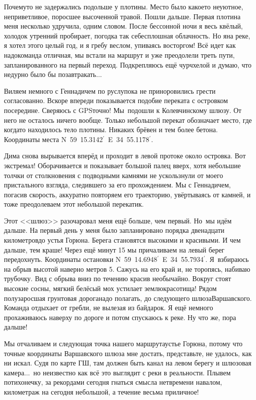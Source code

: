 Почему\sdash то не задержались подольше у плотины. Место было какое\sdash то неуютное, неприветливое, поросшее высоченной травой. Пошли дальше. Первая плотина меня несколько удручила, одним словом. После бессонной ночи я весь квёлый, холодок утренний пробирает, погодка так себе\mdash сплошная облачность. Но я\mdash на реке, я хотел этого целый год, и я гребу веслом, упиваясь восторгом! Всё идет как надо\mdash команда отличная, мы встали на маршрут и уже преодолели треть пути, запланированного на первый переход. Подкрепляюсь ещё чурчхелой и думаю, что недурно было бы позавтракать$\ldots$ 

Виляем немного с Геннадичем по руслу\mdash пока не приноровились грести согласованно. Вскоре впереди показывается подобие переката с островком посередине. Сверяюсь с GPS\mdash точно! Мы~подошли к Колевчинскому шлюзу. От него не осталось ничего вообще. Только небольшой перекат обозначает место, где когда\sdash то находилось тело плотины. Никаких брёвен и тем более бетона. Координаты места N~59\degree~15.3142$^\prime$~E~34\degree~55.1178$^\prime$. 

Дима снова вырывается вперёд и проходит в левой протоке около островка. Вот экстремал! Оборачивается и показывает большой палец вверх, хотя небольшие толчки от столкновения с подводными камнями не ускользнули от моего пристального взгляда, следившего за его прохождением. Мы с Геннадичем, погасив скорость, аккуратно повторяем его траекторию, увёртываясь от камней, и тоже преодолеваем этот небольшой перекатик. 

Этот <<шлюз>> разочаровал меня ещё больше, чем первый. Но~мы идём дальше. На первый день у меня было запланировано порядка двенадцати километров\mdash до устья Горюна. Берега становятся высокими и красивыми. И чем дальше, тем краше! Через ещё минут 15 мы причаливаем на левый берег передохнуть. Координаты остановки N~59\degree~14.6948$^\prime$~E~34\degree~55.7934$^\prime$. Я~взбираюсь на обрыв высотой наверно метров 5. Сажусь на его край и, не торопясь, набиваю трубочку. Вид с обрыва вниз по течению красив необычайно. Вокруг стоят высокие сосны, мягкий белёсый мох устилает землю\mdash красотища! Рядом полузаросшая грунтовая дорога\mdash надо полагать, до следующего шлюза\mdash Варшавского. Команда отдыхает от гребли, не вылезая из байдарок. Я ещё немного прохаживаюсь наверху по дороге и потом спускаюсь к реке. Ну что же, пора дальше! 

Мы отчаливаем и следующая точка нашего маршрута\mdash устье Горюна, потому что точные координаты Варшавского шлюза мне достать, представьте, не удалось, как ни искал. Судя по карте ГШ, там должен быть канал на левом берегу и шлюзовая камера$\ldots$~но неизвестно как всё это выглядит с реки в реальности. Плывем потихонечку, за рекордами сегодня гнаться смысла нет\mdash времени навалом, километраж на сегодня небольшой, а течение весьма приличное! 

